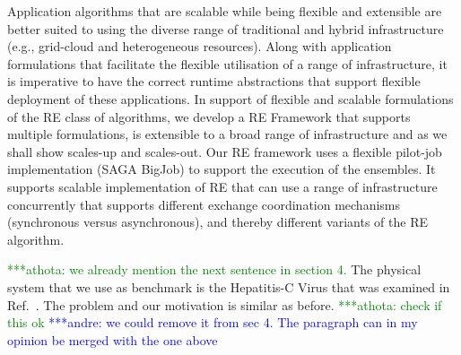 \documentclass{rspublic}
\newcommand{\jhanote}[1]{ {\textcolor{red} { ***shantenu: #1 }}}
\newcommand{\alnote}[1]{ {\textcolor{blue} { ***andre: #1 }}}
\newcommand{\athotanote}[1]{ {\textcolor{green} { ***athota: #1 }}}
\newcommand{\alnote}[1]{}
\newcommand{\athotanote}[1]{}
\newcommand{\jhanote}[1]{}
\begin{document}
Application algorithms that are scalable while being flexible and
extensible are better suited to using the diverse range of traditional
and hybrid infrastructure (e.g., grid-cloud and heterogeneous
resources). Along with application formulations that facilitate the
flexible utilisation of a range of infrastructure, it is imperative to
have the correct runtime abstractions that support flexible deployment
of these applications.  In support of flexible and scalable
formulations of the RE class of algorithms, we develop a RE Framework
that supports multiple formulations, is extensible to a broad range of
infrastructure and as we shall show scales-up and scales-out.  Our RE
framework uses a flexible pilot-job implementation (SAGA BigJob) to
support the execution of the ensembles.  It supports scalable
implementation of RE that can use a range of infrastructure
concurrently that supports different exchange coordination mechanisms
(synchronous versus asynchronous), and thereby different variants of
the RE algorithm.

\athotanote{we already mention the next sentence in section 4.}The physical
system that we use as benchmark is the Hepatitis-C Virus that was
examined in Ref.~\cite{Luckow:2008fp}. The problem and our motivation is similar as before. \athotanote{check if this ok}
\alnote{we could remove it from sec 4. The paragraph can in my opinion 
be merged with the one above}

\end{document}
